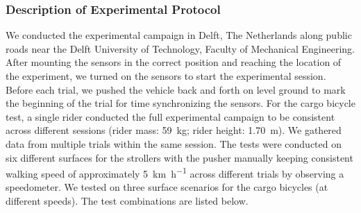 \documentclass[a4paper]{article}
\begin{document}
\subsubsection{Description of Experimental Protocol}
%
We conducted the experimental campaign in Delft, The Netherlands along public
roads near the Delft University of Technology, Faculty of Mechanical
Engineering.
After mounting the sensors in the correct position and reaching the location
of the experiment, we turned on the sensors to start the experimental session.
Before each trial, we pushed the vehicle back and forth on level ground to mark
the beginning of the trial for time synchronizing the sensors.
For the cargo bicycle test, a single rider conducted the full experimental
campaign to be consistent across different sessions (rider mass: 59~\si{\kg};
rider height: 1.70~\si{\m}).
We gathered data from multiple trials within the same session. The tests were
conducted on six different surfaces for the strollers with the pusher manually
keeping consistent walking speed of approximately 5~\si{\kilo\meter\per\hour}
across different trials by observing a speedometer. We tested on three surface
scenarios for the cargo bicycles (at different speeds). The test combinations
are listed below.
%
\end{document}
